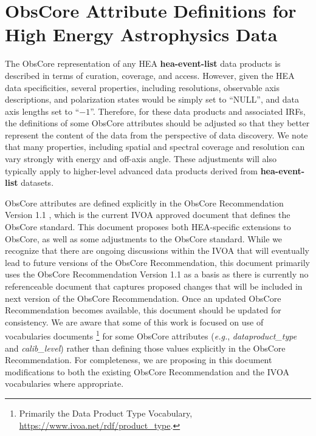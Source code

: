 \documentclass[11pt,a4paper]{ivoa}
\begin{document}
\pagebreak
\section{ObsCore Attribute Definitions for High Energy Astrophysics Data}
\label{sec:obscore}

The ObsCore representation of any \gls{HEA} \textbf{hea-event-list} data products is described in terms of curation, coverage, and access. However, given the \gls{HEA} data specificities, several properties, including resolutions, observable axis descriptions, and polarization states would be simply set to ``NULL'', and data axis lengths set to ``$-1$''. Therefore, for these data products and associated \glspl{IRF}, the definitions of some ObsCore attributes should be adjusted so that they better represent the content of the data from the perspective of data discovery. We note that many properties, including spatial and spectral coverage and resolution can vary strongly with energy and off-axis angle. These adjustments will also typically apply to higher-level advanced data products derived from \textbf{hea-event-list} datasets.


ObsCore attributes are defined explicitly in the ObsCore Recommendation Version 1.1 \citep{2017ivoa.spec.0509L}, which is the current \gls{IVOA} approved document that defines the ObsCore standard.  This document proposes both \gls{HEA}-specific extensions to ObsCore, as well as some adjustments to the ObsCore standard. While we recognize that there are ongoing discussions within the \gls{IVOA} that will eventually lead to future versions of the ObsCore Recommendation, this document primarily uses the ObsCore Recommendation Version 1.1 as a basis as there is currently no referenceable document that captures proposed changes that will be included in next version of the ObsCore Recommendation. Once an updated ObsCore Recommendation becomes available, this document should be updated for consistency. We are aware that some of this work is focused on use of vocabularies documents \citep{2023ivoa.spec.0206D, 2021ivoa.spec.0525D}\footnote{Primarily the Data Product Type Vocabulary, \url{https://www.ivoa.net/rdf/product_type}.} for some ObsCore attributes ({\em e.g.\/}, {\em dataproduct\_type\/} and {\em calib\_level\/}) rather than defining those values explicitly in the ObsCore Recommendation. For completeness, we are proposing in this document modifications to both the existing ObsCore Recommendation and the IVOA vocabularies where appropriate.
\end{document}

